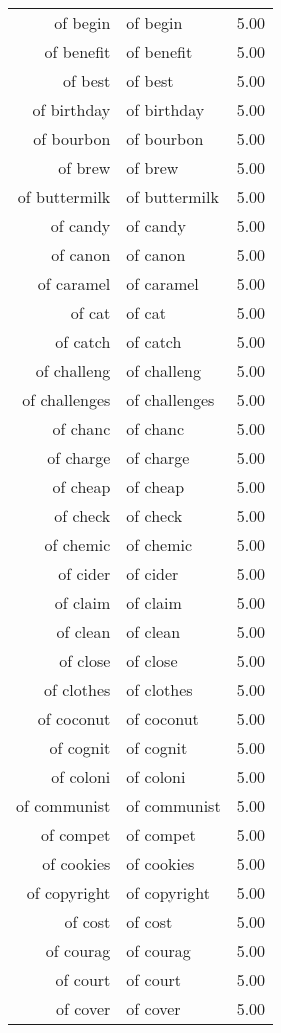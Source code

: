 \begin{table}[ht]
\begin{tabular}{rlr}
  of begin & of begin & 5.00 \\ 
  of benefit & of benefit & 5.00 \\ 
  of best & of best & 5.00 \\ 
  of birthday & of birthday & 5.00 \\ 
  of bourbon & of bourbon & 5.00 \\ 
  of brew & of brew & 5.00 \\ 
  of buttermilk & of buttermilk & 5.00 \\ 
  of candy & of candy & 5.00 \\ 
  of canon & of canon & 5.00 \\ 
  of caramel & of caramel & 5.00 \\ 
  of cat & of cat & 5.00 \\ 
  of catch & of catch & 5.00 \\ 
  of challeng & of challeng & 5.00 \\ 
  of challenges & of challenges & 5.00 \\ 
  of chanc & of chanc & 5.00 \\ 
  of charge & of charge & 5.00 \\ 
  of cheap & of cheap & 5.00 \\ 
  of check & of check & 5.00 \\ 
  of chemic & of chemic & 5.00 \\ 
  of cider & of cider & 5.00 \\ 
  of claim & of claim & 5.00 \\ 
  of clean & of clean & 5.00 \\ 
  of close & of close & 5.00 \\ 
  of clothes & of clothes & 5.00 \\ 
  of coconut & of coconut & 5.00 \\ 
  of cognit & of cognit & 5.00 \\ 
  of coloni & of coloni & 5.00 \\ 
  of communist & of communist & 5.00 \\ 
  of compet & of compet & 5.00 \\ 
  of cookies & of cookies & 5.00 \\ 
  of copyright & of copyright & 5.00 \\ 
  of cost & of cost & 5.00 \\ 
  of courag & of courag & 5.00 \\ 
  of court & of court & 5.00 \\ 
  of cover & of cover & 5.00 \\ 

\end{tabular}
\end{table}
